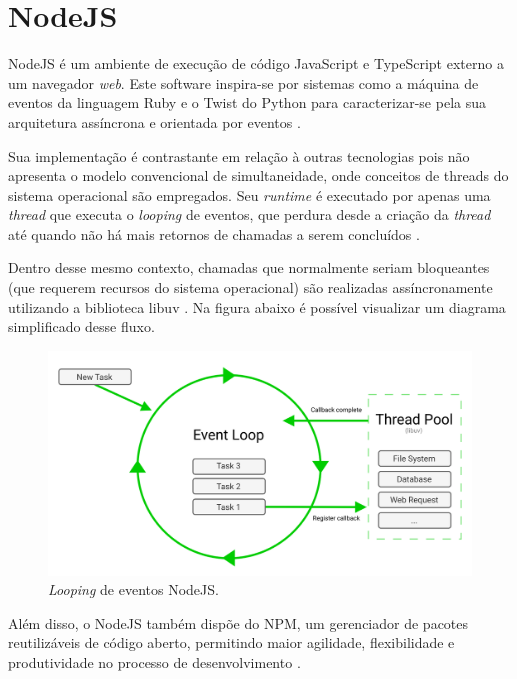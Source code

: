 \section{NodeJS}
\label{sec:nodejs}
NodeJS é um ambiente de execução de código JavaScript e TypeScript externo a um navegador \textit{web}. Este software inspira-se por sistemas como a máquina de eventos da linguagem Ruby e o Twist do Python para caracterizar-se pela sua arquitetura assíncrona e orientada por eventos \cite{Foundation2023}. 

Sua implementação é contrastante em relação à outras tecnologias pois não apresenta o modelo convencional de simultaneidade, onde conceitos de threads do sistema operacional são empregados.  Seu \textit{runtime} é executado por apenas uma \textit{thread} que executa o \textit{looping} de eventos, que perdura desde a criação da \textit{thread} até quando não há mais retornos de chamadas a serem concluídos \cite{Foundation2023}.

Dentro desse mesmo contexto, chamadas que normalmente seriam bloqueantes (que requerem recursos do sistema operacional) são realizadas assíncronamente utilizando a biblioteca libuv \cite{ClaudioWunder}. Na figura abaixo é possível visualizar um diagrama simplificado desse fluxo.

\begin{figure}[H]
    \centering
    \caption{\textit{Looping} de eventos NodeJS.}
    \label{fig:nodejs}
    \includegraphics[width=.8\textwidth]{data/figures/nodejs.png}
\end{figure}

Além disso, o NodeJS também dispõe do NPM, um gerenciador de pacotes reutilizáveis de código aberto, permitindo maior agilidade, flexibilidade e produtividade no processo de desenvolvimento \cite{npm2022}.